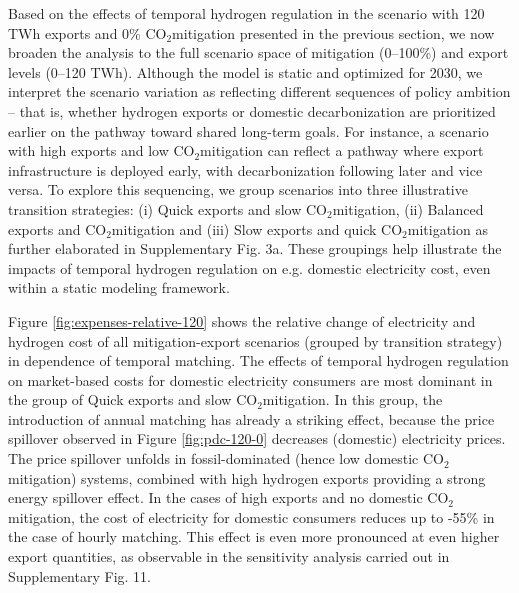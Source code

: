 \documentclass[5p,numafflabel]{elsarticle}
\newcommand{\co}{\ce{CO2}~}
\def\co{CO${}_2${\:}}
\begin{document}

Based on the effects of temporal hydrogen regulation in the scenario with 120 TWh exports and 0\% \co mitigation presented in the previous section, we now broaden the analysis to the full scenario space of mitigation (0–100\%) and export levels (0–120 TWh).
Although the model is static and optimized for 2030, we interpret the scenario variation as reflecting different sequences of policy ambition -- that is, whether hydrogen exports or domestic decarbonization are prioritized earlier on the pathway toward shared long-term goals. For instance, a scenario with high exports and low \co mitigation can reflect a pathway where export infrastructure is deployed early, with decarbonization following later and vice versa.
To explore this sequencing, we group scenarios into three illustrative transition strategies: 
(i) Quick exports and slow \co mitigation,
(ii) Balanced exports and \co mitigation and
(iii) Slow exports and quick \co mitigation as further elaborated in Supplementary Fig. 3a. %
These groupings help illustrate the impacts of temporal hydrogen regulation on e.g. domestic electricity cost, even within a static modeling framework.

Figure \ref{fig:expenses-relative-120} shows the relative change of electricity and hydrogen cost of all mitigation-export scenarios (grouped by transition strategy) in dependence of temporal matching. 
The effects of temporal hydrogen regulation on market-based costs for domestic electricity consumers are most dominant in the group of Quick exports and slow \co mitigation.
In this group, the introduction of annual matching has already a striking effect, because the price spillover observed in Figure \ref{fig:pdc-120-0} decreases (domestic) electricity prices. The price spillover unfolds in fossil-dominated (hence low domestic \co mitigation) systems, combined with high hydrogen exports providing a strong energy spillover effect. In the cases of high exports and no domestic \co mitigation, the cost of electricity for domestic consumers reduces up to -55\% in the case of hourly matching.
This effect is even more pronounced at even higher export quantities, as observable in the sensitivity analysis carried out in Supplementary Fig. 11. %
\end{document}
